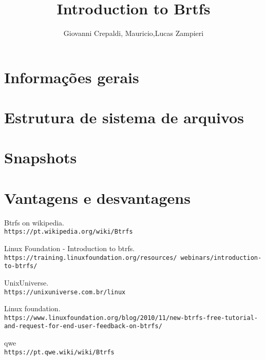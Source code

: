 \documentclass{article}
\begin{document}
\title{Introduction to Brtfs}
\author{Giovanni Crepaldi, Mauricio,Lucas Zampieri}


\maketitle

\section{Informações gerais}

\section{Estrutura de sistema de arquivos}

\section{Snapshots}

\section{Vantagens e desvantagens}

\begin{thebibliography}{9}
Btrfs on wikipedia.
\\\texttt{https://pt.wikipedia.org/wiki/Btrfs}

Linux Foundation - Introduction to btrfs.
\\\texttt{https://training.linuxfoundation.org/resources/\
webinars/introduction-to-btrfs/}

UnixUniverse.
\\\texttt{https://unixuniverse.com.br/linux}

Linux foundation.
\\\texttt{https://www.linuxfoundation.org/blog/2010/11/new-btrfs-free-tutorial-and-request-for-end-user-feedback-on-btrfs/}

qwe
\\\texttt{https://pt.qwe.wiki/wiki/Btrfs}

\end{thebibliography}
\end{document}
